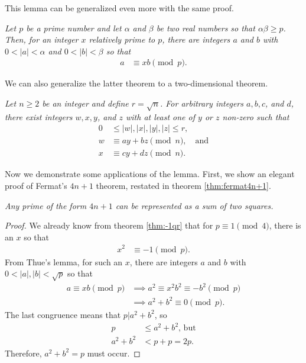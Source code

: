 \documentclass{subfile}
\begin{document}
	This lemma can be generalized even more with the same proof.
	\begin{theorem}\slshape
		Let $p$ be a prime number and let $\alpha$ and $\beta$ be two real numbers so that $\alpha\beta \geq p$. Then, for an integer $x$ relatively prime to $p$, there are integers $a$ and $b$ with $0<|a|<\alpha$ and $0<|b|<\beta $ so that
		\begin{align*}
			a & \equiv xb\pmod p.
		\end{align*} 
	\end{theorem}
	We can also generalize the latter theorem to a two-dimensional theorem.
	\begin{theorem}\slshape
		Let $n\geq2$ be an integer and define $r=\sqrt{n}$. For arbitrary integers $a,b,c$, and $d$, there exist integers $w,x,y$, and $z$ with at least one of $y$ or $z$ non-zero such that
		\begin{align*}
			0& \leq |w|,|x|,|y|,|z|\leq r,\\
			w&\equiv ay+bz\pmod n, \quad \text{and}\\
			x&\equiv cy+dz\pmod n.
		\end{align*}
	\end{theorem}
	
	
	Now we demonstrate some applications of the lemma. First, we show an elegant proof of Fermat's $4n+1$ theorem, restated in theorem \autoref{thm:fermat4n+1}.
	
	\begin{theorem}\label{thm:fermat4n+1}\slshape
		Any prime of the form $4n+1$ can be represented as a sum of two squares.
	\end{theorem}

	\begin{proof}
		We already know from theorem \autoref{thm:-1qr} that for $p\equiv1\pmod4$, there is an $x$ so that
		\begin{align*}
			x^2 & \equiv-1\pmod p.
		\end{align*}
		From Thue's lemma, for such an $x$, there are integers $a$ and $b$ with $0<|a|,|b|<\sqrt{p}$ so that
		\begin{align*}
			a \equiv xb \pmod p & \implies	a^2 \equiv x^2b^2 \equiv -b^2\pmod p\\
			& \implies	a^2+b^2 \equiv 0 \pmod p.
		\end{align*}
		The last congruence means that $p|a^2+b^2$, so
		\begin{align*}
			p   &\leq a^2+b^2\text {, but}\\
			a^2+b^2	&< p+p = 2p.
		\end{align*}
		Therefore, $a^2+b^2=p$ must occur.
	\end{proof}
\end{document}
